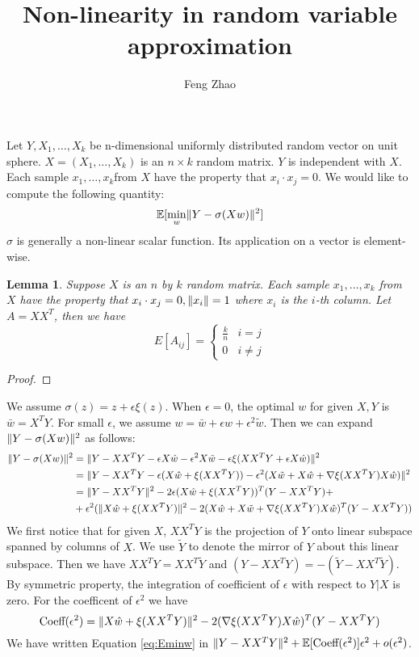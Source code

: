 \documentclass{article}
\title{Non-linearity in random variable approximation}
\author{Feng Zhao}
\DeclarePairedDelimiter\norm{\lVert}{\rVert}
\def\E{\mathbb{E}}
\newtheorem{lemma}{Lemma}
\begin{document}
\maketitle
Let $Y, X_1, \dots, X_k$ be n-dimensional uniformly distributed random vector on unit sphere. $X=(X_1, \dots, X_k)$ is an $n\times k$ random matrix. $Y$ is independent with $X$. Each sample $x_1, \dots, x_k$from $X$ have the property that $x_i \cdot x_j = 0$. We would like to compute the following quantity:
\begin{equation}\label{eq:Eminw}
\E[\min_w \norm{Y - \sigma (X w ) }^2]
\end{equation}
$\sigma$ is generally a non-linear scalar function. Its application on a vector is element-wise.
\begin{lemma}
Suppose $X$ is an $n$ by $k$ random matrix. Each sample $x_1, \dots, x_k$ from $X$ have the property that $x_i \cdot x_j = 0, \norm{x_i}=1$ where $x_i$ is the $i$-th column.  Let $A=X X^T$, then we have
\begin{equation}
E[A_{ij}]= \begin{cases}
\frac{k}{n} & i = j\\
0 & i\neq j 
\end{cases}
\end{equation}
\end{lemma}
\begin{proof}

\end{proof}
We assume $\sigma(z) = z + \epsilon \xi(z)$. When $\epsilon = 0$, the optimal $w$ for given $X, Y$ is 
$\bar{w} = X^T Y $. For small $\epsilon$, we assume $ w = \bar{w} + \epsilon \hat{w} + \epsilon^2 \tilde{w}$. Then we can expand $\norm{Y - \sigma (X w ) }^2$ as follows:
\begin{align*}
\norm{Y - \sigma (X w ) }^2 & = \norm{Y - XX^T Y - \epsilon X \hat{w} - \epsilon^2 X \tilde{w} - \epsilon \xi(XX^T Y + \epsilon X\hat{w}) }^2 \\
& = \norm{ Y - XX^T Y - \epsilon (X\hat{w} + \xi(XX^T Y)) - \epsilon^2(X\tilde{w} + X\hat{w} + \nabla \xi(XX^TY)X\hat{w})}^2 \\
& = \norm{Y-XX^T Y }^2 - 2 \epsilon (X \hat{w} + \xi(XX^TY))^T (Y-XX^TY) +\\
& +\epsilon^2(\norm{X\hat{w} + \xi(XX^TY)}^2 - 2 (X\hat{w} + X \tilde{w}+ \nabla \xi(XX^TY)X\hat{w})^T(Y-XX^TY))
\end{align*}
We first notice that for given $X$, $XX^TY$ is the projection of $Y$ onto linear subspace spanned by columns of $X$. We use $\tilde{Y}$ to denote the mirror of $Y$ about this linear subspace. Then we have
$XX^T Y = XX^T \tilde{Y}$ and $(Y- XX^TY) = -(\tilde{Y} - XX^T \tilde{Y})$. By symmetric property, the integration of coefficient of $\epsilon$ with respect to $Y|X$ is zero. For the coefficent of $\epsilon^2$ we have
\begin{equation*}
\textrm{Coeff}(\epsilon^2)  =  \norm{X\hat{w} + \xi(XX^TY)}^2 - 2 (\nabla \xi(XX^TY)X\hat{w})^T(Y-XX^TY)
\end{equation*}
We have written Equation \eqref{eq:Eminw} in $ \norm{Y - X X^T Y}^2 + \E[\textrm{Coeff}(\epsilon^2)] \epsilon^2 + o(\epsilon^2)$.
\end{document}
